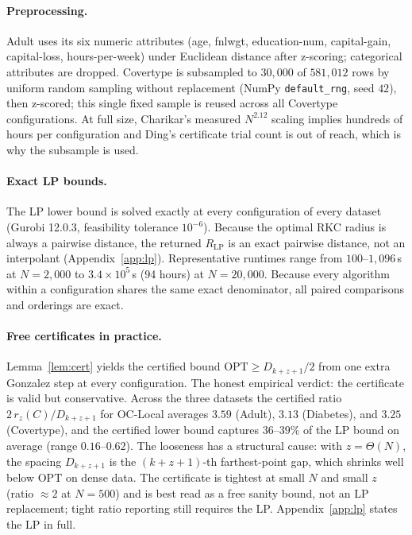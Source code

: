 \documentclass[twoside,leqno,twocolumn]{article}
\newcommand{\OPT}{\mathrm{OPT}}
\newcommand{\rz}{r_z}
\begin{document}
\paragraph{Preprocessing.}
Adult uses its six numeric attributes (age, fnlwgt, education-num,
capital-gain, capital-loss, hours-per-week) under Euclidean distance
after z-scoring; categorical attributes are dropped. Covertype is
subsampled to $30{,}000$ of $581{,}012$ rows by uniform random
sampling without replacement (NumPy \texttt{default\_rng}, seed $42$),
then z-scored; this single fixed sample is reused across all Covertype
configurations. At full size, Charikar's measured $N^{2.12}$ scaling
implies hundreds of hours per configuration and Ding's certificate
trial count is out of reach, which is why the subsample is used.

\paragraph{Exact LP bounds.}
The LP lower bound is solved exactly at every configuration of every
dataset (Gurobi 12.0.3, feasibility tolerance $10^{-6}$). Because the
optimal RKC radius is always a pairwise distance, the returned
$R_{\mathrm{LP}}$ is an exact pairwise distance, not an interpolant
(Appendix~\ref{app:lp}). Representative runtimes range from
$100$--$1{,}096$\,s at $N=2{,}000$ to $3.4\times10^{5}$\,s (94 hours)
at $N=20{,}000$. Because every algorithm within a configuration shares
the same exact denominator, all paired comparisons and orderings are
exact.

\paragraph{Free certificates in practice.}
Lemma~\ref{lem:cert} yields the certified bound $\OPT\ge
D_{k+z+1}/2$ from one extra Gonzalez step at every configuration. The
honest empirical verdict: the certificate is valid but conservative.
Across the three datasets the certified ratio
$2\,\rz(C)/D_{k+z+1}$ for OC-Local averages $3.59$ (Adult), $3.13$
(Diabetes), and $3.25$ (Covertype), and the certified lower bound
captures $36$--$39\%$ of the LP bound on average (range $0.16$--$0.62$).
The looseness has a structural cause: with $z=\Theta(N)$, the spacing
$D_{k+z+1}$ is the $(k{+}z{+}1)$-th farthest-point gap, which shrinks
well below $\OPT$ on dense data. The certificate is tightest at small
$N$ and small $z$ (ratio ${\approx}2$ at $N=500$) and is best read as a
free sanity bound, not an LP replacement; tight ratio reporting still
requires the LP. Appendix~\ref{app:lp} states the LP in full.
\end{document}
